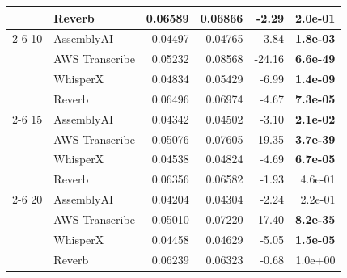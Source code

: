 \begin{tabular}{llrrrr}
  & Reverb & 0.06589 & 0.06866 & -2.29 &  2.0e-01 \\
\cmidrule(r){2-6}
10 & AssemblyAI & 0.04497 & 0.04765 & -3.84 & \textbf{ 1.8e-03} \\
  & AWS Transcribe & 0.05232 & 0.08568 & -24.16 & \textbf{ 6.6e-49} \\
  & WhisperX & 0.04834 & 0.05429 & -6.99 & \textbf{ 1.4e-09} \\
  & Reverb & 0.06496 & 0.06974 & -4.67 & \textbf{ 7.3e-05} \\
\cmidrule(r){2-6}
15 & AssemblyAI & 0.04342 & 0.04502 & -3.10 & \textbf{ 2.1e-02} \\
  & AWS Transcribe & 0.05076 & 0.07605 & -19.35 & \textbf{ 3.7e-39} \\
  & WhisperX & 0.04538 & 0.04824 & -4.69 & \textbf{ 6.7e-05} \\
  & Reverb & 0.06356 & 0.06582 & -1.93 &  4.6e-01 \\
\cmidrule(r){2-6}
20 & AssemblyAI & 0.04204 & 0.04304 & -2.24 &  2.2e-01 \\
  & AWS Transcribe & 0.05010 & 0.07220 & -17.40 & \textbf{ 8.2e-35} \\
  & WhisperX & 0.04458 & 0.04629 & -5.05 & \textbf{ 1.5e-05} \\
  & Reverb & 0.06239 & 0.06323 & -0.68 &  1.0e+00 \\
\bottomrule
\end{tabular}
